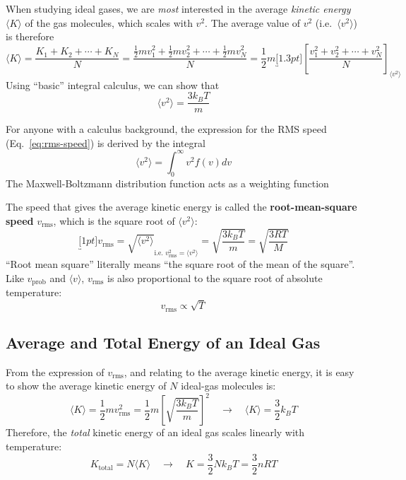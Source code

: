 When studying ideal gases, we are \emph{most} interested in the average
\emph{kinetic energy} $\langle K\rangle$ of the gas molecules, which scales
with $v^2$. The average value of $v^2$ (i.e.\ $\langle v^2\rangle$) is therefore
\begin{equation}
  \langle K\rangle =\dfrac{K_1+K_2+\cdots+K_N}N
  =\dfrac{\frac12mv_1^2+\frac12mv_2^2+\cdots+\frac12mv_N^2}N
  =\frac12m
  \underbracket[1.3pt]{
    \left[\frac{v_1^2+v_2^2+\cdots+v_N^2}N\right]
  }_{\langle v^2\rangle}
\end{equation}
Using ``basic'' integral calculus, we can show that
\begin{equation}
  \langle v^2\rangle=\frac{3k_BT}m
  \label{eq:rms-speed}
\end{equation}
\begin{remark}
  For anyone with a calculus background, the expression for the RMS speed
  (Eq.~\ref{eq:rms-speed}) is derived by the integral
  \begin{equation*}
    \langle v^2\rangle=\int_0^\infty v^2f(v)dv
  \end{equation*}
  The Maxwell-Boltzmann distribution function acts as a weighting function
\end{remark}
The speed that gives the average kinetic energy is called the
\textbf{root-mean-square speed} $v_\text{rms}$, which is the square root of
$\langle v^2\rangle$:
\begin{equation}
  \underbracket[1pt]{v_\text{rms}=\sqrt{\langle v^2\rangle}}_{
    \text{i.e.\ }v_\text{rms}^2=\langle v^2\rangle}
  =\sqrt{\frac{3k_BT}m}=\sqrt{\frac{3RT}M}
\end{equation}
``Root mean square'' literally means ``the square root of the mean of the
square''. Like $v_\text{prob}$ and $\langle v\rangle$, $v_\text{rms}$ is
also proportional to the square root of absolute temperature:
\begin{equation}
  v_\text{rms}\propto\sqrt T
\end{equation}



\subsection{Average and Total Energy of an Ideal Gas}

From the expression of $v_\text{rms}$, and relating to the average kinetic
energy, it is easy to show the average kinetic energy of $N$ ideal-gas
molecules is:
\begin{equation}
  \langle K \rangle=\frac12mv_\text{rms}^2=
  \frac12m\left[\sqrt{\frac{3k_BT}m}\right]^2
  \quad\rightarrow\quad
  \boxed{\langle K\rangle=\frac32k_BT}
\end{equation}
Therefore, the \emph{total} kinetic energy of an ideal gas scales linearly with
temperature:
\begin{equation}
  K_\text{total}=N\langle K\rangle\quad\longrightarrow\quad
  \boxed{
    K=\frac32Nk_BT=\frac32nRT
  }
\end{equation}




